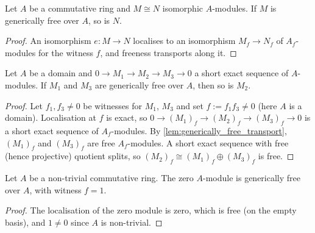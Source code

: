 \begin{lemma}
  \label{lem:generically_free_of_equiv}
  Let \(A\) be a commutative ring and \(M \cong N\) isomorphic \(A\)-modules.
  If \(M\) is generically free over \(A\), so is \(N\).
\end{lemma}

\begin{proof}
\leanok
  An isomorphism \(e : M \to N\) localises to an isomorphism
  \(M_f \to N_f\) of \(A_f\)-modules for the witness \(f\), and freeness
  transports along it.
\end{proof}

\begin{lemma}
  \label{lem:generically_free_splice}
  Let \(A\) be a domain and \(0 \to M_1 \to M_2 \to M_3 \to 0\) a short exact
  sequence of \(A\)-modules.  If \(M_1\) and \(M_3\) are generically free over
  \(A\), then so is \(M_2\).
\end{lemma}

\begin{proof}
\leanok
  Let \(f_1, f_3 \ne 0\) be witnesses for \(M_1\), \(M_3\) and set
  \(f := f_1 f_3 \ne 0\) (here \(A\) is a domain).  Localisation at \(f\) is
  exact, so \(0 \to (M_1)_f \to (M_2)_f \to (M_3)_f \to 0\) is a short exact
  sequence of \(A_f\)-modules.  By
  \cref{lem:generically_free_transport}, \((M_1)_f\) and \((M_3)_f\) are free
  \(A_f\)-modules.  A short exact sequence with free (hence projective)
  quotient splits, so \((M_2)_f \cong (M_1)_f \oplus (M_3)_f\) is free.
\end{proof}

\begin{lemma}
  \label{lem:generically_free_subsingleton}
  Let \(A\) be a non-trivial commutative ring.  The zero \(A\)-module is
  generically free over \(A\), with witness \(f = 1\).
\end{lemma}

\begin{proof}
\leanok
  The localisation of the zero module is zero, which is free (on the empty
  basis), and \(1 \ne 0\) since \(A\) is non-trivial.
\end{proof}

